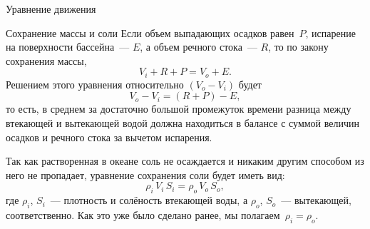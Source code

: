 \begin{chapter}{Уравнение движения}
\begin{section}{Сохранение массы и соли}
Если объем выпадающих осадков равен~$P$, испарение на поверхности 
бассейна~--- $E$, а объем речного стока~--- $R$, то по закону сохранения массы,
\begin{equation}
V_i + R + P = V_o + E.
\end{equation}
Решением этого уравнения относительно $(V_o - V_i)$ будет
\begin{equation}\label{eq:7.3}
V_o - V_i = (R + P) - E,
\end{equation}
то есть, в среднем за достаточно большой промежуток времени
разница между втекающей и вытекающей водой должна находиться в балансе
с суммой величин осадков и речного стока за вычетом испарения.
%

Так как растворенная в океане соль не осаждается и никаким другим способом 
из него не пропадает, уравнение сохранения соли будет иметь вид:
\begin{equation}\label{eq:7.4}
\rho_i \, V_i \, S_i = \rho_o \, V_o \, S_o,
\end{equation}
где $\rho_i$, $S_i$~--- плотность и солёность втекающей воды, а $\rho_o$,
$S_o$~--- вытекающей, соответственно. Как это уже было сделано ранее, мы
полагаем~$\rho_i = \rho_o$.
%


\end{section}
\end{chapter}
